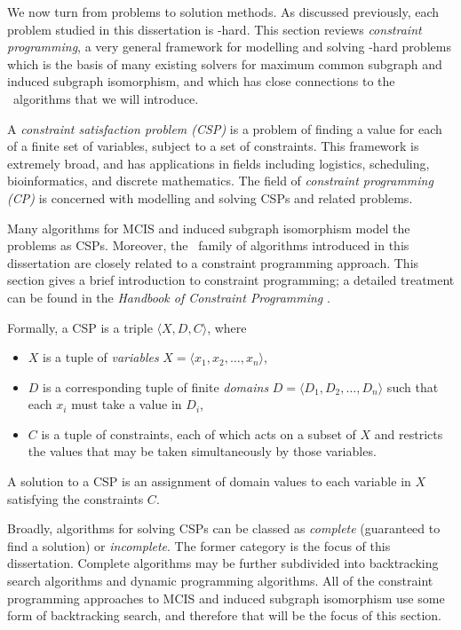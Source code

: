 We now turn from problems to solution methods.  As discussed previously, each
problem studied in this dissertation is \NP-hard.  This section reviews
\emph{constraint programming}, a very general framework for modelling and
solving \NP-hard problems which is the basis of many existing solvers for
maximum common subgraph and induced subgraph isomorphism, and which has close
connections to the \McSplit\ algorithms that we will introduce.

A \emph{constraint satisfaction problem (CSP)} is a problem of finding a value
for each of a finite set of variables, subject to a set of constraints.
This framework is extremely broad, and has applications in fields
including logistics, scheduling, bioinformatics, and discrete mathematics.
The field of \emph{constraint programming (CP)} is concerned with modelling
and solving CSPs and related problems.

Many algorithms
for MCIS and induced subgraph isomorphism model the problems as CSPs.
Moreover, the \McSplit\ family of algorithms introduced in this dissertation
are closely related to a constraint programming approach.
This section gives a brief introduction to constraint programming;
a detailed treatment can be found in the \emph{Handbook of Constraint
Programming} \citep{DBLP:reference/fai/2}.

Formally, a CSP is a triple $\langle X, D, C\rangle$, where

\begin{itemize}
\item $X$ is a tuple of \emph{variables} $X = \langle x_1, x_2, \dots, x_n \rangle$,
\item $D$ is a corresponding tuple of finite \emph{domains} $D = \langle D_1, D_2, \dots, D_n\rangle$
  such that each $x_i$ must take a value in $D_i$,
\item $C$ is a tuple of constraints, each of which acts on a subset of $X$ and restricts
  the values that may be taken simultaneously by those variables.
\end{itemize}

A solution to a CSP is an assignment of domain values to each variable in $X$
satisfying the constraints $C$.

Broadly, algorithms for solving CSPs can be classed as \emph{complete} (guaranteed to find a solution)
or \emph{incomplete}. The former category is the focus of this dissertation.
Complete algorithms may be further
subdivided into backtracking search algorithms and dynamic programming
algorithms. All of the constraint programming approaches to MCIS and induced
subgraph isomorphism use some form of backtracking search, and therefore that will
be the focus of this section.

